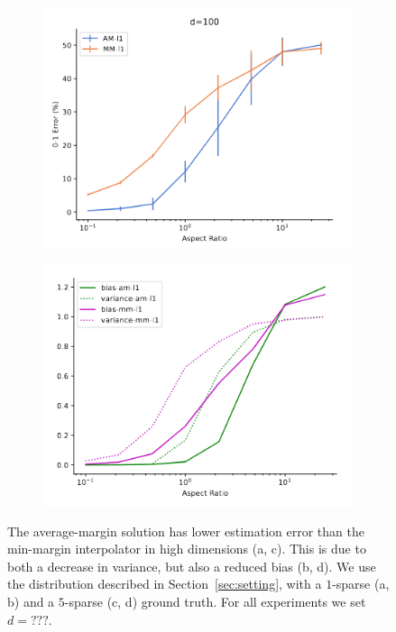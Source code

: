 \begin{figure}[t]
\begin{subfigure}[t]{0.24\linewidth}
    \label{fig:bias_variance_s1}
    \caption{}
  \end{subfigure}
  \hfill
  \begin{subfigure}[t]{0.24\linewidth}
    \centering
    \includegraphics[width=\columnwidth]{figures/estim_err_s5.png}
    \label{fig:estim_err_s5}
    \caption{}
  \end{subfigure}
  \hfill
  \begin{subfigure}[t]{0.24\linewidth}
    \centering
    \includegraphics[width=\columnwidth]{figures/bias_variance_s5.png}
    \label{fig:bias_variance_s5}
    \caption{}
  \end{subfigure}

  \caption{The average-margin solution has lower estimation error than the
    min-margin interpolator in high dimensions (a, c). This is due to both a
    decrease in variance, but also a reduced bias (b, d). We use the
    distribution described in Section~\ref{sec:setting}, with a $1$-sparse (a,
    b) and a $5$-sparse (c, d) ground truth. For all experiments we set
  $d=???$.}
  \label{fig:gmm_experiments}

\end{figure}



